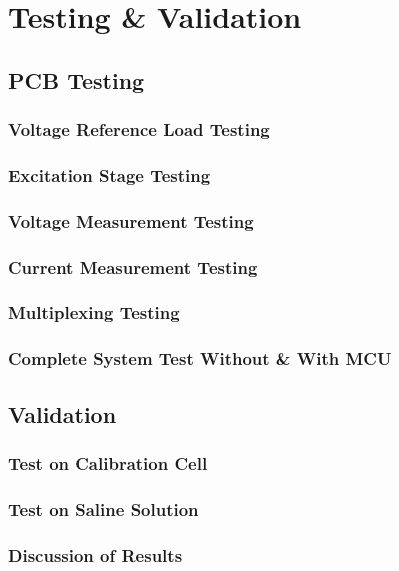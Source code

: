 \graphicspath{{testing_and_validation/fig/}}

\chapter{Testing \& Validation}

\section{PCB Testing}

\subsection{Voltage Reference Load Testing}

\subsection{Excitation Stage Testing}

\subsection{Voltage Measurement Testing}

\subsection{Current Measurement Testing}

\subsection{Multiplexing Testing}

\subsection{Complete System Test Without \& With MCU}

\section{Validation}

\subsection{Test on Calibration Cell}

\subsection{Test on Saline Solution}

\subsection{Discussion of Results}

\label{chap:testing_and_validation}